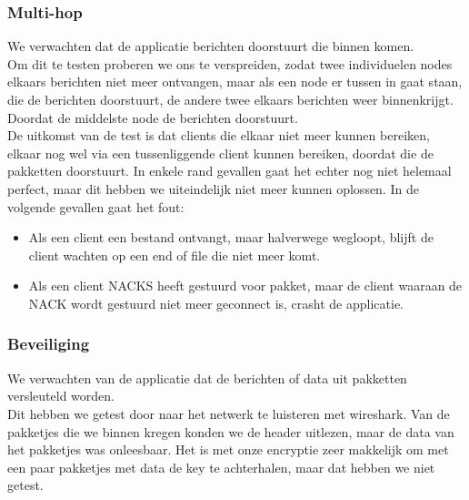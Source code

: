 \documentclass{article}
\begin{document}
\subsubsection{Multi-hop}
We verwachten dat de applicatie berichten doorstuurt die binnen komen. \\
Om dit te testen proberen we ons te verspreiden, zodat twee individuelen nodes elkaars berichten niet meer ontvangen, maar als een node er tussen in gaat staan, die de berichten doorstuurt, de andere twee elkaars berichten weer binnenkrijgt. Doordat de middelste node de berichten doorstuurt. \\
De uitkomst van de test is dat clients die elkaar niet meer kunnen bereiken, elkaar nog wel via een tussenliggende client kunnen bereiken, doordat die de pakketten doorstuurt. In enkele rand gevallen gaat het echter nog niet helemaal perfect, maar dit hebben we uiteindelijk niet meer kunnen oplossen. In de volgende gevallen gaat het fout: \\
\begin{itemize}
\item Als een client een bestand ontvangt, maar halverwege wegloopt, blijft de client wachten op een end of file die niet meer komt.
\item Als een client NACKS heeft gestuurd voor pakket, maar de client waaraan de NACK wordt gestuurd niet meer geconnect is, crasht de applicatie.
\end{itemize}

\subsubsection{Beveiliging}
We verwachten van de applicatie dat de berichten of data uit pakketten versleuteld worden. \\
Dit hebben we getest door naar het netwerk te luisteren met wireshark. Van de pakketjes die we binnen kregen konden we de header uitlezen, maar de data van het pakketjes was onleesbaar. Het is met onze encryptie zeer makkelijk om met een paar pakketjes met data de key te achterhalen, maar dat hebben we niet getest. 
\end{document}
